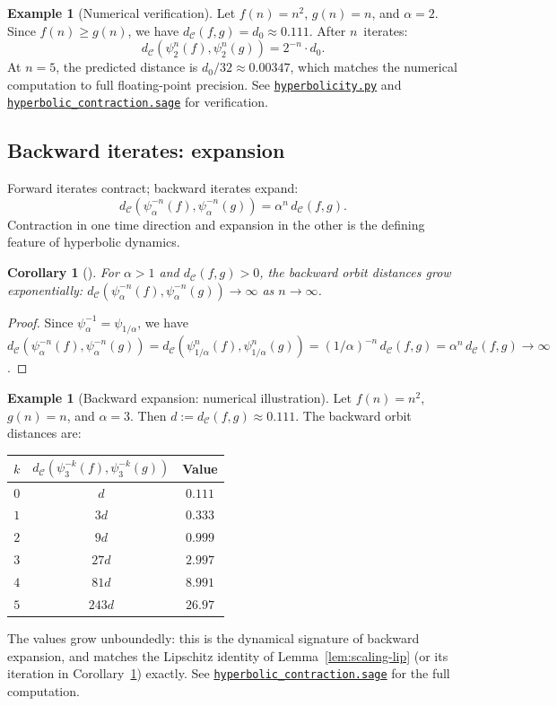 \documentclass[11pt,a4paper]{article}
\newcommand{\repourl}{https://github.com/gabayae/expansive-homeomorphisms-complexity-qmetric}
\theoremstyle{plain}
\newtheorem{corollaryinner}[theoreminner]{Corollary}
\theoremstyle{definition}
\newtheorem{exampleinner}[theoreminner]{Example}
\newenvironment{corollary}[1][]{\begin{corollaryinner}[#1]}{\end{corollaryinner}}
\newenvironment{example}[1][]{\begin{exampleinner}[#1]}{\end{exampleinner}}
\newcommand{\C}{\mathcal{C}}
\begin{document}
\begin{example}[Numerical verification]\label{ex:hyper-numerical}
Let $f(n)=n^2$, $g(n)=n$, and $\alpha=2$.  Since $f(n)\ge g(n)$,
we have $d_\C(f,g)=d_0\approx 0.111$.  After $n$~iterates:
\[
  d_\C(\psi_2^n(f),\psi_2^n(g))
  = 2^{-n}\cdot d_0.
\]
At $n=5$, the predicted distance is $d_0/32\approx 0.00347$, which
matches the numerical computation to full floating-point precision.
See
\href{\repourl/blob/main/code/python/hyperbolicity.py}{\texttt{hyperbolicity.py}} and
\href{\repourl/blob/main/code/sagemath/hyperbolic_contraction.sage}{\texttt{hyperbolic\_contraction.sage}}
for verification.
\end{example}

\subsection{Backward iterates: expansion}

Forward iterates contract; backward iterates expand:
\[
  d_\C(\psi_\alpha^{-n}(f),\psi_\alpha^{-n}(g))
  = \alpha^n\,d_\C(f,g).
\]
Contraction in one time direction and expansion in the other is
the defining feature of hyperbolic dynamics.

\begin{corollary}\label{cor:backward-expansion}
For $\alpha>1$ and $d_\C(f,g)>0$, the backward orbit distances
grow exponentially:
$d_\C(\psi_\alpha^{-n}(f),\psi_\alpha^{-n}(g))\to\infty$ as
$n\to\infty$.
\end{corollary}

\begin{proof}
Since $\psi_\alpha^{-1}=\psi_{1/\alpha}$, we have
$d_\C(\psi_\alpha^{-n}(f),\psi_\alpha^{-n}(g))
=d_\C(\psi_{1/\alpha}^n(f),\psi_{1/\alpha}^n(g))
=(1/\alpha)^{-n}\,d_\C(f,g)=\alpha^n\,d_\C(f,g)\to\infty$.
\end{proof}

\begin{example}[Backward expansion: numerical illustration]\label{ex:backward-num}
Let $f(n)=n^2$, $g(n)=n$, and $\alpha=3$.  Then
$d:=d_\C(f,g)\approx 0.111$.  The backward orbit distances are:
\begin{center}
\begin{tabular}{ccc}
\hline
$k$ & $d_\C(\psi_3^{-k}(f),\psi_3^{-k}(g))$ & Value \\\hline
$0$ & $d$    & $0.111$ \\
$1$ & $3d$   & $0.333$ \\
$2$ & $9d$   & $0.999$ \\
$3$ & $27d$  & $2.997$ \\
$4$ & $81d$  & $8.991$ \\
$5$ & $243d$ & $26.97$ \\
\hline
\end{tabular}
\end{center}
The values grow unboundedly: this is the dynamical signature of
backward expansion, and matches the Lipschitz identity of
Lemma~\ref{lem:scaling-lip} (or its iteration in
Corollary~\ref{cor:backward-expansion}) exactly.
See
\href{\repourl/blob/main/code/sagemath/hyperbolic_contraction.sage}{\texttt{hyperbolic\_contraction.sage}}
for the full computation.
\end{example}
\end{document}
